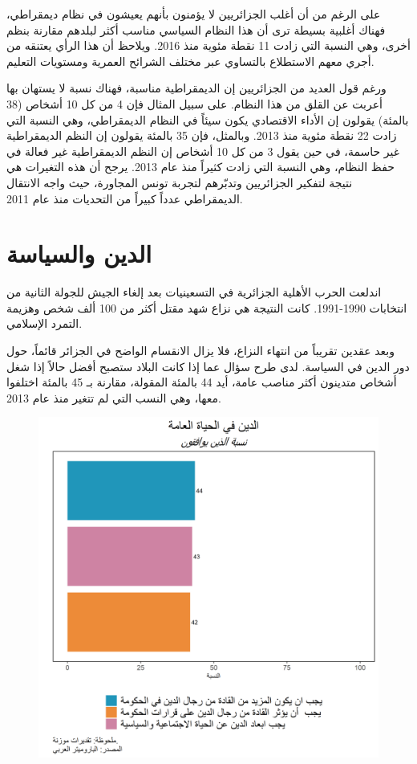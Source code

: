 \documentclass{article}
\begin{document}
 على الرغم من أن أغلب الجزائريين لا يؤمنون بأنهم يعيشون في نظام ديمقراطي، فهناك أغلبية بسيطة ترى أن هذا النظام السياسي مناسب أكثر لبلدهم مقارنة بنظم أخرى، وهي النسبة التي زادت 11 نقطة مئوية منذ 2016. ويلاحظ أن هذا الرأي يعتنقه من أجري معهم الاستطلاع بالتساوي عبر مختلف الشرائح العمرية ومستويات التعليم.
	
 ورغم قول العديد من الجزائريين إن الديمقراطية مناسبة، فهناك نسبة لا يستهان بها أعربت عن القلق من هذا النظام. على سبيل المثال فإن 4 من كل 10 أشخاص (38 بالمئة) يقولون إن الأداء الاقتصادي يكون سيئاً في النظام الديمقراطي، وهي النسبة التي زادت 22 نقطة مئوية منذ 2013. وبالمثل، فإن 35 بالمئة يقولون إن النظم الديمقراطية غير حاسمة، في حين يقول 3 من كل 10 أشخاص إن النظم الديمقراطية غير فعالة في حفظ النظام، وهي النسبة التي زادت كثيراً منذ عام 2013. يرجح أن هذه التغيرات هي نتيجة لتفكير الجزائريين وتدبّرهم لتجربة تونس المجاورة، حيث واجه الانتقال الديمقراطي عدداً كبيراً من التحديات منذ عام 2011.
	
\section*{الدين والسياسة }

 اندلعت الحرب الأهلية الجزائرية في التسعينيات بعد إلغاء الجيش للجولة الثانية من انتخابات 1990-1991. كانت النتيجة هي نزاع شهد مقتل أكثر من 100 ألف شخص وهزيمة التمرد الإسلامي.
	
 وبعد عقدين تقريباً من انتهاء النزاع، فلا يزال الانقسام الواضح في الجزائر قائماً، حول دور الدين في السياسة. لدى طرح سؤال عما إذا كانت البلاد ستصبح أفضل حالاً إذا شغل أشخاص متدينون أكثر مناصب عامة، أيد 44 بالمئة المقولة، مقارنة بـ 45 بالمئة اختلفوا معها، وهي النسب التي لم تتغير منذ عام 2013.
	
	\begin{center}
		\begin{figure}[H]
			\centering
			\includegraphics[width=13cm]{Q606.png}
		\end{figure}
	\end{center}
	
\end{document}
